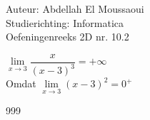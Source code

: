 \documentclass[a4paper]{article}
\begin{document}
  
\noindent \large Auteur: Abdellah El Moussaoui \\
\noindent \large Studierichting: Informatica\\
\noindent \large Oefeningenreeks 2D nr. 10.2\\

\medskip

\normalsize


$\lim\limits_{x\to3}\dfrac{x}{\left(x-3\right)^3}=+\infty$\\

Omdat $\lim\limits_{x\to3} (x-3)^2 = 0^+$\\



\begin{thebibliography}{999}
\end{thebibliography}
\end{document}
